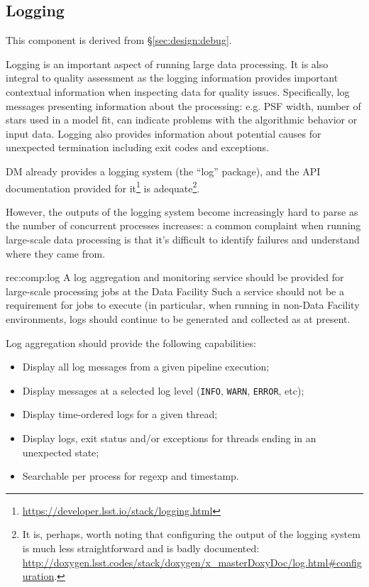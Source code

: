 \subsection{Logging}
\label{sec:comp:log}

This component is derived from \S\ref{sec:design:debug}.

Logging is an important aspect of running large data processing.  It is also
integral to quality assessment as the logging information provides important
contextual information when inspecting data for quality issues.  Specifically,
log messages presenting information about the processing: e.g. PSF width,
number of stars used in a model fit, can indicate problems with the
algorithmic behavior or input data.  Logging also provides information about
potential causes for unexpected termination including exit codes and
exceptions.

DM already provides a logging system (the ``log'' package), and the API
documentation provided for
it\footnote{\url{https://developer.lsst.io/stack/logging.html}} is
adequate\footnote{It is, perhaps, worth noting that configuring the output of the
logging system is much less straightforward and is badly documented:
\url{http://doxygen.lsst.codes/stack/doxygen/x_masterDoxyDoc/log.html\#configuration}.}.

However, the outputs of the logging system become increasingly hard to parse
as the number of concurrent processes increases: a common complaint when
running large-scale data processing is that it's difficult to identify
failures and understand where they came from.

\begin{recommendation}
  {rec:comp:log}
  {A log aggregation and monitoring service should be provided for large-scale processing jobs at the Data Facility}
Such a service should not be a requirement for jobs to execute (in particular,
when running in non-Data Facility environments, logs should continue to be
generated and collected as at present.
\end{recommendation}

Log aggregation should provide the following capabilities:

\begin{itemize}
\item{Display all log messages from a given pipeline execution;}
\item{Display messages at a selected log level (\texttt{INFO}, \texttt{WARN}, \texttt{ERROR}, etc);}
\item{Display time-ordered logs for a given thread;}
\item{Display logs, exit status and/or exceptions for threads ending in an unexpected state;}
\item{Searchable per process for regexp and timestamp.}
\end{itemize}

